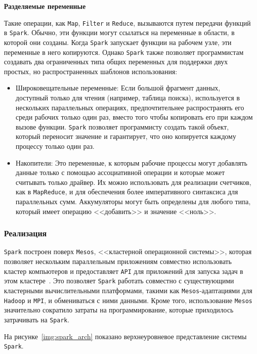 \textbf{Разделяемые переменные}

Такие операции, как \texttt{Map}, \texttt{Filter} и \texttt{Reduce}, вызываются путем передачи функций в \texttt{Spark}.
Обычно, эти функции могут ссылаться на переменные в области, в которой они созданы.
Когда \texttt{Spark} запускает функции на рабочем узле, эти переменные в него копируются. 
Однако \texttt{Spark} также позволяет программистам создавать два ограниченных типа общих переменных для поддержки двух простых, но распространенных шаблонов использования:
\begin{itemize}
  \item Широковещательные переменные: Если большой фрагмент данных, доступный только для чтения (например, таблица поиска), используется в нескольких параллельных операциях, предпочтительнее распространять его среди рабочих только один раз, вместо того чтобы копировать его при каждом вызове функции. 
    \texttt{Spark} позволяет программисту создать такой объект, который переносит значение и гарантирует, что оно копируется каждому процессу только один раз.
  \item Накопители: Это переменные, к которым рабочие процессы могут добавлять данные только с помощью ассоциативной операции и которые может считывать только драйвер. 
    Их можно использовать для реализации счетчиков, как в \texttt{MapReduce}, и для обеспечения более императивного синтаксиса для параллельных сумм. 
    Аккумуляторы могут быть определены для любого типа, который имеет операцию <<добавить>> и значение <<ноль>>.
\end{itemize} 

\subsubsection{Реализация}

\texttt{Spark} построен поверх \texttt{Mesos}, <<кластерной операционной системы>>, которая позволяет нескольким параллельным приложениям совместно использовать кластер компьютеров и предоставляет \texttt{API} для приложений для запуска задач в этом кластере~\cite{266915}.
Это позволяет \texttt{Spark} работать совместно с существующими кластерными вычислительными платформами, такими как \texttt{Mesos}-адаптациями для \texttt{Hadoop} и \texttt{MPI}, и обмениваться с ними данными. 
Кроме того, использование \texttt{Mesos} значительно сократило затраты на программирование, которые приходилось затрачивать на \texttt{Spark}.

На рисунке~\ref{img:spark_arch} показано верхнеуровневое представление системы \texttt{Spark}.

